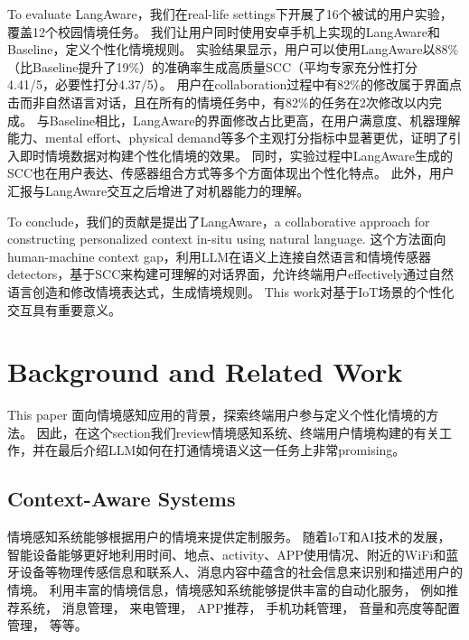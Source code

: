 
To evaluate LangAware，我们在real-life settings下开展了16个被试的用户实验，覆盖12个校园情境任务。
我们让用户同时使用安卓手机上实现的LangAware和Baseline，定义个性化情境规则。
实验结果显示，用户可以使用LangAware以88\%（比Baseline提升了19\%）的准确率生成高质量SCC（平均专家充分性打分4.41/5，必要性打分4.37/5）。
用户在collaboration过程中有82\%的修改属于界面点击而非自然语言对话，且在所有的情境任务中，有82\%的任务在2次修改以内完成。
与Baseline相比，LangAware的界面修改占比更高，在用户满意度、机器理解能力、mental effort、physical demand等多个主观打分指标中显著更优，证明了引入即时情境数据对构建个性化情境的效果。
同时，实验过程中LangAware生成的SCC也在用户表达、传感器组合方式等多个方面体现出个性化特点。
此外，用户汇报与LangAware交互之后增进了对机器能力的理解。

To conclude，我们的贡献是提出了LangAware，a collaborative approach for constructing personalized context in-situ using natural language.
这个方法面向human-machine context gap，利用LLM在语义上连接自然语言和情境传感器detectors，基于SCC来构建可理解的对话界面，允许终端用户effectively通过自然语言创造和修改情境表达式，生成情境规则。
This work对基于IoT场景的个性化交互具有重要意义。

\section{Background and Related Work}

This paper 面向情境感知应用的背景，探索终端用户参与定义个性化情境的方法。
因此，在这个section我们review情境感知系统、终端用户情境构建的有关工作，并在最后介绍LLM如何在打通情境语义这一任务上非常promising。

\subsection{Context-Aware Systems}

情境感知系统能够根据用户的情境来提供定制服务\cite{dey_understanding_2001}。
随着IoT和AI技术的发展，智能设备能够更好地利用时间、地点、activity、APP使用情况、附近的WiFi和蓝牙设备等物理传感信息和联系人、消息内容中蕴含的社会信息来识别和描述用户的情境。
利用丰富的情境信息，情境感知系统能够提供丰富的自动化服务，
例如推荐系统\cite{villegas_characterizing_2018}，
消息管理\cite{li_alert_2022,mehrotra_prefminer_2016,hyungik_oh_intelligent_2015,pielot_beyond_2017}，
来电管理\cite{khalil_context-aware_2005}，
APP推荐\cite{chen_cap_2019}，
手机功耗管理\cite{lee_context-aware_2016,qi_context-aware_2013}，
音量和亮度等配置管理\cite{ambeth_kumar_active_2020,abeywardhane_optimization_2018}，
等等。

